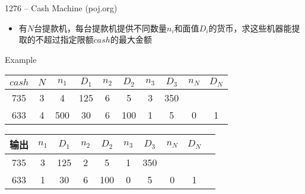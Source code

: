 \begin{frame}{1276 -- Cash Machine (poj.org)}
    \begin{itemize}
        \item 有$N$台提款机，每台提款机提供不同数量$n_i$和面值$D_i$的货币，求这些机器能提取的不超过指定限额$cash$的最大金额
    \end{itemize}
    \vfill
    \begin{exampleblock}{Example}
        \begin{table}
            \begin{tabular}{cccccccccc}
                $cash$ & $N$    & $n_1$   & $D_1$   & $n_2$   & $D_2$   & $n_3$   & $D_3$   & $n_N$   & $D_N$  \\\hline
                735  & 3    & 4    & 125  & 6    & 5    & 3    & 350  &      &    \\\hline
                633  & 4    & 500  & 30   & 6    & 100  & 1    & 5    & 0    & 1  \\\hline
            \end{tabular}
        \end{table}
        \begin{table}
            \begin{tabular}{cccccccccc}
                输出 & $n_1$   & $D_1$   & $n_2$   & $D_2$   & $n_3$   & $D_3$   & $n_N$   & $D_N$  \\\hline
                735  & 3  & 125  & 2    & 5    & 1    & 350  &      &    \\\hline
                633  & 1  & 30   & 6    & 100  & 0    & 5    & 0    & 1  \\\hline
            \end{tabular}
        \end{table}
        
    \end{exampleblock}
\end{frame}  


